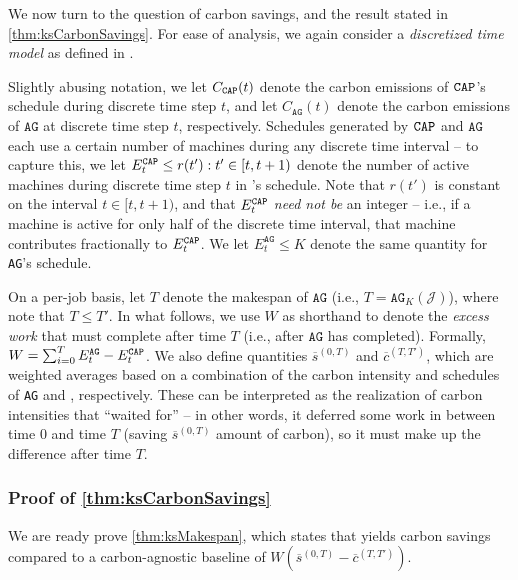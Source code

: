 \noindent We now turn to the question of carbon savings, and the result stated in \autoref{thm:ksCarbonSavings}.  
For ease of analysis, we again consider a \textit{discretized time model} as defined in .

Slightly abusing notation, we let $C_{\texttt{CAP}}(t)$ denote the carbon emissions of $\texttt{CAP}$'s schedule during discrete time step $t$, and let $C_{\texttt{AG}}(t)$ denote the carbon emissions of $\texttt{AG}$ at discrete time step $t$, respectively.  
Schedules generated by $\texttt{CAP}$ and $\texttt{AG}$ each use a certain number of machines during any discrete time interval -- to capture this, we let $E^\texttt{CAP}_t \leq r(t') : t' \in [t, t+1)$ denote the number of active machines during discrete time step $t$ in \CAP's schedule.  Note that  $r(t')$ is constant on the interval $t \in [t, t+1)$, and that $E^\texttt{CAP}_t$ \textit{need not be} an integer -- i.e., if a machine is active for only half of the discrete time interval, that machine contributes fractionally to $E^\texttt{CAP}_t$.  We let $E^\texttt{AG}_t \leq K$ denote the same quantity for \texttt{AG}'s schedule.

On a per-job basis, let $T$ denote the makespan of $\texttt{AG}$ (i.e., $T = \texttt{AG}_K(\mathcal{J})$), where note that $T \le T'$.
In what follows, we use $W$ as shorthand to denote the \textit{excess work} that \CAP must complete after time $T$ (i.e., after $\texttt{AG}$ has completed).  Formally, $W = \sum_{i=0}^T E^\texttt{AG}_t - E^\texttt{CAP}_t$.  We also define quantities $\overline{s}^{(0,T)}$ and $\overline{c}^{(T, T')}$, which are weighted averages based on a combination of the carbon intensity and schedules of \texttt{AG} and \CAP, respectively. 
These can be interpreted as the realization of carbon intensities that \CAP ``waited for'' -- in other words, it deferred some work in between time $0$ and time $T$ (saving $\overline{s}^{(0,T)} $ amount of carbon), so it must make up the difference after time $T$.  

\subsubsection{\textbf{Proof of \autoref{thm:ksCarbonSavings}}}\label{apx:ksCarbonSavings}

We are ready prove \autoref{thm:ksMakespan}, which states that \CAP yields carbon savings compared to a carbon-agnostic baseline of $W \left( \overline{s}^{(0,T)} - \overline{c}^{(T, T')} \right)$.

